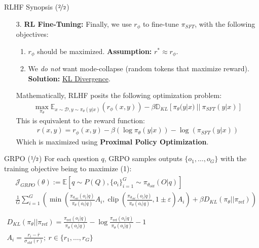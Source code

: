 \documentclass{beamer}
\DeclareMathOperator*{\clip}{clip}
\begin{document}
\begin{frame}{RLHF Synopsis ($\nicefrac{2}{2}$)}
	\begin{enumerate}
		\item[3.] \textbf{RL Fine-Tuning:} Finally, we use $r_\phi$ to fine-tune $\pi_{SFT}$, with the following objectives:
			\begin{enumerate}[label=\alph*.]
				\item $r_\phi$ should be maximized. \textbf{Assumption:} $r^* \approx r_\phi$. \pause
				\item We \textit{do not} want mode-collapse (random tokens that maximize reward). \pause \textbf{Solution:} \underline{KL Divergence}. \pause
			\end{enumerate}
			Mathematically, RLHF posits the following optimization problem:
			\begin{gather}
				\max_{\pi_\theta}\mathbb{E}_{x\sim\mathcal{D}, y \sim \pi_\theta(y|x)}(r_\phi(x,y)) -\beta \mathbb{D}_{KL}[\pi_\theta(y|x)~||~\pi_{SFT}(y|x)]
			\end{gather} \pause
			This is equivalent to the reward function:
			\begin{gather}
				r(x,y) = r_\phi(x,y) - \beta(\log \pi_\theta(y|x)) - \log(\pi_{SFT}(y|x))
			\end{gather}
			Which is maximized using \textbf{Proximal Policy Optimization}.
	\end{enumerate}
\end{frame}

\begin{frame}{GRPO ($\nicefrac{1}{2}$)}
	For each question $q$, GRPO samples outputs $\{o_1, \ldots, o_G\}$ with the training objective being to maximize (1):
	\begin{gather}
		\begin{split}
			&\mathcal{J}_{GRPO}(\theta) := \mathbb{E}[q \sim P(Q), \{o_i\}^G_{i=1} \sim \pi_{\theta_{old}}(O | q)] \\
			&\frac{1}{G} \sum^G_{i=1} \left(\min \left(\frac{\pi_{\theta_{old}}(o_i | q)}{\pi_\theta(o_i | q)} A_i, \clip \left( \frac{\pi_{\theta_{old}}(o_i | q)}{\pi_\theta(o_i | q)}, 1 \pm \varepsilon \right)  A_i \right) + \beta D_{KL}(\pi_\theta || \pi_{\text{ref}}) \right) \\
		\end{split} \\
		D_{KL}(\pi_\theta || \pi_{\text{ref}}) = \frac{\pi_{\text{ref}}(o_i | q)}{\pi_\theta(o_i | q)} - \log \frac{\pi_{\text{ref}}(o_i | q)}{\pi_\theta(o_i | q)} - 1 \\
		A_i = \frac{r_i - \bar{r}}{\sigma_{std}(r)};\ r \in \{r_1, \ldots, r_G \}
	\end{gather}
\end{frame}
\end{document}
